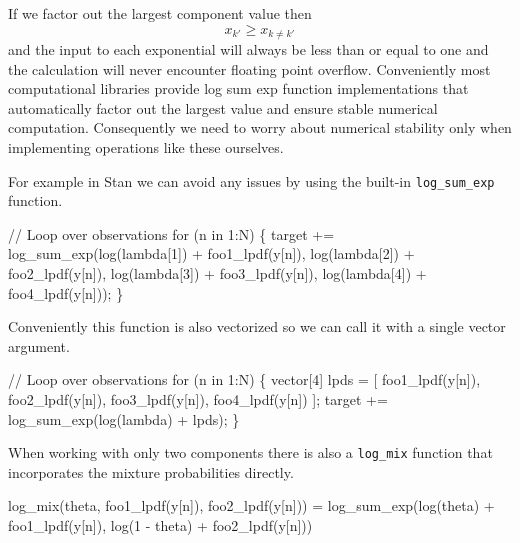 \documentclass[
  letterpaper,
  DIV=11,
  numbers=noendperiod]{scrartcl}
\newenvironment{Shaded}{\begin{snugshade}}{\end{snugshade}}
\newcommand{\CommentTok}[1]{\textcolor[rgb]{0.37,0.37,0.37}{#1}}
\newcommand{\ControlFlowTok}[1]{\textcolor[rgb]{0.00,0.23,0.31}{#1}}
\newcommand{\DataTypeTok}[1]{\textcolor[rgb]{0.68,0.00,0.00}{#1}}
\newcommand{\DecValTok}[1]{\textcolor[rgb]{0.68,0.00,0.00}{#1}}
\newcommand{\KeywordTok}[1]{\textcolor[rgb]{0.00,0.23,0.31}{#1}}
\newcommand{\NormalTok}[1]{\textcolor[rgb]{0.00,0.23,0.31}{#1}}
\begin{document}
If we factor out the largest component value then \[
x_{k'} \ge x_{k \ne k'}
\] and the input to each exponential will always be less than or equal
to one and the calculation will never encounter floating point overflow.
Conveniently most computational libraries provide log sum exp function
implementations that automatically factor out the largest value and
ensure stable numerical computation. Consequently we need to worry about
numerical stability only when implementing operations like these
ourselves.

For example in Stan we can avoid any issues by using the built-in
\texttt{log\_sum\_exp} function.

\begin{Shaded}
\begin{Highlighting}[]
\CommentTok{// Loop over observations}
\ControlFlowTok{for}\NormalTok{ (n }\ControlFlowTok{in} \DecValTok{1}\NormalTok{:N) \{}
  \KeywordTok{target +=}\NormalTok{ log\_sum\_exp(log(lambda[}\DecValTok{1}\NormalTok{]) + foo1\_lpdf(y[n]),}
\NormalTok{                        log(lambda[}\DecValTok{2}\NormalTok{]) + foo2\_lpdf(y[n]),}
\NormalTok{                        log(lambda[}\DecValTok{3}\NormalTok{]) + foo3\_lpdf(y[n]),}
\NormalTok{                        log(lambda[}\DecValTok{4}\NormalTok{]) + foo4\_lpdf(y[n]));}
\NormalTok{\}}
\end{Highlighting}
\end{Shaded}

Conveniently this function is also vectorized so we can call it with a
single vector argument.

\begin{Shaded}
\begin{Highlighting}[]
\CommentTok{// Loop over observations}
\ControlFlowTok{for}\NormalTok{ (n }\ControlFlowTok{in} \DecValTok{1}\NormalTok{:N) \{}
  \DataTypeTok{vector}\NormalTok{[}\DecValTok{4}\NormalTok{] lpds = [ foo1\_lpdf(y[n]), foo2\_lpdf(y[n]),}
\NormalTok{                     foo3\_lpdf(y[n]), foo4\_lpdf(y[n]) ]\textquotesingle{};}
  \KeywordTok{target +=}\NormalTok{ log\_sum\_exp(log(lambda) + lpds);}
\NormalTok{\}}
\end{Highlighting}
\end{Shaded}

When working with only two components there is also a \texttt{log\_mix}
function that incorporates the mixture probabilities directly.

\begin{Shaded}
\begin{Highlighting}[]
\NormalTok{log\_mix(theta, foo1\_lpdf(y[n]), foo2\_lpdf(y[n]))}
\NormalTok{=}
\NormalTok{log\_sum\_exp(log(theta)     + foo1\_lpdf(y[n]),}
\NormalTok{            log(}\DecValTok{1}\NormalTok{ {-} theta) + foo2\_lpdf(y[n]))}
\end{Highlighting}
\end{Shaded}
\end{document}
